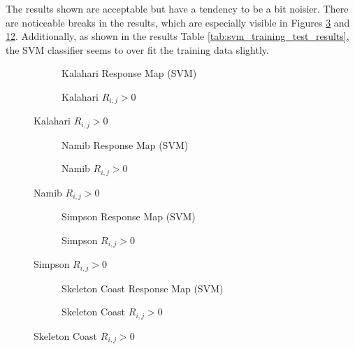 The results shown are acceptable but have a tendency to be a bit noisier. There are noticeable breaks in the results, which are especially visible in Figures \ref{fig:kalahari_SVM_response_overlay} and \ref{fig:SkeletonCoast_SVM_response_overlay}. Additionally, as shown in the results Table \ref{tab:svm_training_test_results}, the SVM classifier seems to over fit the training data slightly. 
\begin{figure}[H]
	\centering
	\begin{subfigure}{0.48\textwidth}
		\centering
		\caption{Kalahari Response Map (SVM)}
		\label{fig:kalahari_SVM_response}
	\end{subfigure}
	\begin{subfigure}{0.48\textwidth}
		\centering
		\caption{ Kalahari $R_{i,j} > 0$}
		\label{fig:kalahari_SVM_response_overlay}
	\end{subfigure}
\end{figure}
\begin{figure}[H]
	\ContinuedFloat
	\centering
	\begin{subfigure}{0.48\textwidth}
		\centering
		\caption{Namib Response Map (SVM)}
		\label{fig:namib_SVM_response}
	\end{subfigure}
	\begin{subfigure}{0.48\textwidth}
		\centering
		\caption{ Namib $R_{i,j} > 0$}
		\label{fig:namib_SVM_response_overlay}
	\end{subfigure}
\end{figure}
\begin{figure}[H]
	\ContinuedFloat
	\centering
	\begin{subfigure}{0.48\textwidth}
		\centering
		\caption{Simpson Response Map (SVM)}
		\label{fig:simpson_SVM_response}
	\end{subfigure}
	\begin{subfigure}{0.48\textwidth}
		\centering
		\caption{ Simpson $R_{i,j} > 0$}
		\label{fig:simpson_SVM_response_overlay}
	\end{subfigure}
\end{figure}
\begin{figure}[H]
	\ContinuedFloat
	\centering
	\begin{subfigure}{0.48\textwidth}
		\centering
		\caption{Skeleton Coast Response Map (SVM)}
		\label{fig:SkeletonCoast_SVM_response}
	\end{subfigure}
	\begin{subfigure}{0.48\textwidth}
		\centering
		\caption{ Skeleton Coast $R_{i,j} > 0$}
		\label{fig:SkeletonCoast_SVM_response_overlay}
	\end{subfigure}
\end{figure}
